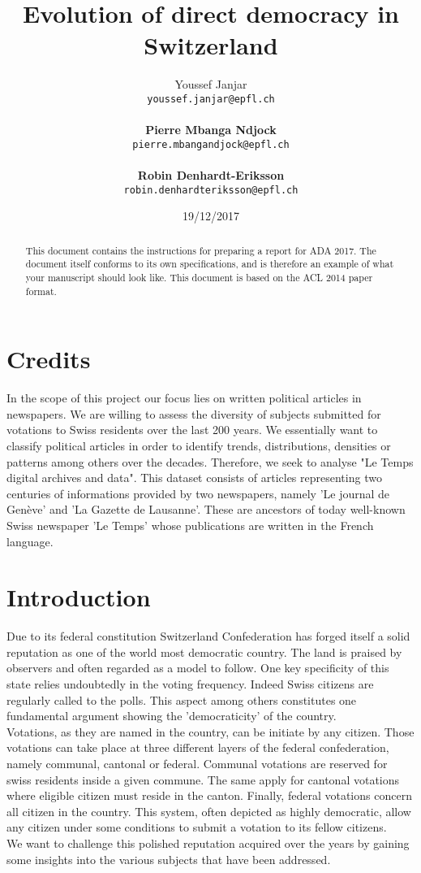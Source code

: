 \documentclass[11pt]{article}
\title{Evolution of direct democracy in Switzerland}
\author{Youssef Janjar \\
  {\tt youssef.janjar@epfl.ch} \\\\
  \textbf{Pierre Mbanga Ndjock} \\
  {\tt pierre.mbangandjock@epfl.ch} \\\\
\textbf{Robin Denhardt-Eriksson} \\
{\tt robin.denhardteriksson@epfl.ch} \\}
\date{19/12/2017}
\begin{document}
\maketitle
\begin{abstract}
  This document contains the instructions for preparing a report for ADA 2017. The document itself conforms to its own specifications, and is therefore an example of
  what your manuscript should look like. This document is based on the ACL 2014 paper format.
\end{abstract}

\bigskip
\section{Credits}


In the scope of this project our focus lies on written political articles in newspapers.
We are willing to assess the diversity of subjects submitted for votations to Swiss residents over
the last 200 years. We essentially want to classify political articles in order to identify trends,
distributions, densities or patterns among others over the decades. Therefore, we seek to analyse 
"Le Temps digital archives and data". This dataset consists of articles representing two centuries
of informations provided by two newspapers, namely 'Le journal de Genève' and 'La Gazette de Lausanne'.
These are ancestors of today well-known Swiss newspaper 'Le Temps' whose publications are written in
the French language.
\\


\section{Introduction}

Due to its federal constitution Switzerland Confederation has forged itself
a solid reputation as one of the world most democratic country. The land is praised by observers and often
regarded as a model to follow. One key specificity of this state relies undoubtedly in the voting frequency.
Indeed Swiss citizens are regularly called to the polls. This aspect among others constitutes one fundamental
argument showing the 'democraticity' of the country.
\\
Votations, as they are named in the country, can be initiate by any citizen. Those votations can take place at
three different layers of the federal confederation, namely communal, cantonal or federal. Communal votations
are reserved for swiss residents inside a given commune. The same apply for cantonal votations where eligible citizen
must reside in the canton. Finally, federal votations concern all citizen in the country. This system, often
depicted as highly democratic, allow any citizen under some conditions to submit a votation to its fellow citizens.
\\
We want to challenge this polished reputation acquired over the years by gaining some insights into the various
subjects that have been addressed. 
\end{document}
